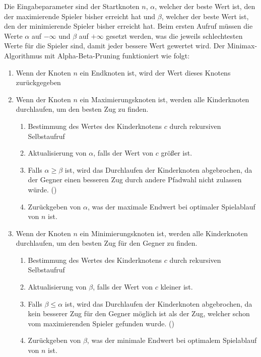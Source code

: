 Die Eingabeparameter sind der Startknoten $n$, $\alpha$, welcher der beste Wert ist, den der maximierende Spieler bisher erreicht hat und $\beta$, welcher der beste Wert ist, den der minimierende Spieler bisher erreicht hat. Beim ersten Aufruf müssen die Werte $\alpha$ auf $-\infty$ und $\beta$ auf $+\infty$ gesetzt werden, was die jeweils schlechtesten Werte für die Spieler sind, damit jeder bessere Wert gewertet wird. Der Minimax-Algorithmus mit Alpha-Beta-Pruning funktioniert wie folgt:

\begin{enumerate}
    \item Wenn der Knoten $n$ ein Endknoten ist, wird der Wert dieses Knotens zurückgegeben
    \item Wenn der Knoten $n$ ein Maximierungsknoten ist, werden alle Kinderknoten durchlaufen, um den besten Zug zu finden.
          \begin{enumerate}
              \item Bestimmung des Wertes des Kinderknotens $c$ durch rekursiven Selbstaufruf
              \item Aktualisierung von $\alpha$, falls der Wert von $c$ größer ist.
              \item Falls $\alpha \geq \beta$ ist, wird das Durchlaufen der Kinderknoten abgebrochen, da der Gegner einen besseren Zug durch andere Pfadwahl nicht zulassen würde. ()
              \item Zurückgeben von $\alpha$, was der maximale Endwert bei optimaler Spielablauf von $n$ ist.
          \end{enumerate}
    \item Wenn der Knoten $n$ ein Minimierungsknoten ist, werden alle Kinderknoten durchlaufen, um den besten Zug für den Gegner zu finden.
          \begin{enumerate}
              \item Bestimmung des Wertes des Kinderknotens $c$ durch rekursiven Selbstaufruf
              \item Aktualisierung von $\beta$, falls der Wert von $c$ kleiner ist.
              \item Falls $\beta \leq \alpha$ ist, wird das Durchlaufen der Kinderknoten abgebrochen, da kein besserer Zug für den Gegner möglich ist als der Zug, welcher schon vom maximierenden Spieler  gefunden wurde. ()
              \item Zurückgeben von $\beta$, was der minimale Endwert bei optimalem Spielablauf von $n$ ist.
          \end{enumerate}
\end{enumerate}

